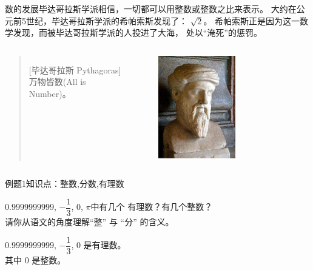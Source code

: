     \begin{frame}[shrink=5]{数的发展}{毕达哥拉斯学派相信，一切都可以用整数或整数之比来表示。}
        大约在公元前5世纪，毕达哥拉斯学派的希帕索斯发现了：
        $\sqrt{2}$。
        希帕索斯正是因为这一数学发现，而被毕达哥拉斯学派的人投进了大海，
        处以“淹死”的惩罚。
        \begin{columns}

            \begin{quotation}[毕达哥拉斯 Pythagoras]
                万物皆数(All is Number)。
            \end{quotation}
            \begin{figure}
                \centering
                \includegraphics[width=0.6\textwidth]{assets/Kapitolinischer_Pythagoras_adjusted.jpg}
            \end{figure}
        \end{columns}
        
    \end{frame}

    \begin{frame}{例题1}{知识点：整数,分数,有理数}
        \begin{block}{}
            $0.9999999999$, $-\dfrac{1}{3}$, $0$, $\pi$中有几个
            有理数？有几个整数？\\ 请你从语文的角度理解“整” 与 “分” 的含义。
        \end{block}

        \pause $0.9999999999$, $-\dfrac{1}{3}$, $0$ 是有理数。\\
        其中 $0$ 是整数。
    \end{frame}

